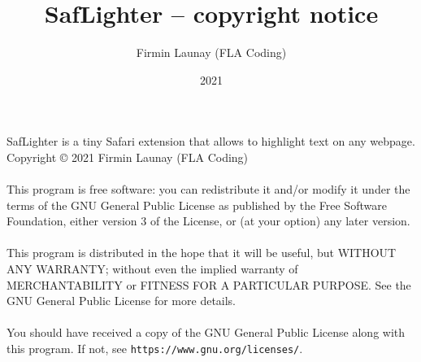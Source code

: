 \documentclass[11pt]{article}
\title{SafLighter -- copyright notice}
\date{2021}
\author{Firmin Launay (FLA Coding)}
\begin{document}
\maketitle

\setlength\parindent{0pt}

SafLighter is a tiny Safari extension that allows to highlight text on any webpage. \\
Copyright © 2021 Firmin Launay (FLA Coding) \\
\\
This program is free software: you can redistribute it and/or modify
it under the terms of the GNU General Public License as published by
the Free Software Foundation, either version 3 of the License, or
(at your option) any later version. \\
\\
This program is distributed in the hope that it will be useful,
but WITHOUT ANY WARRANTY; without even the implied warranty of
MERCHANTABILITY or FITNESS FOR A PARTICULAR PURPOSE.  See the
GNU General Public License for more details. \\
\\
You should have received a copy of the GNU General Public License
along with this program.  If not, see \texttt{https://www.gnu.org/licenses/}.
\end{document}
